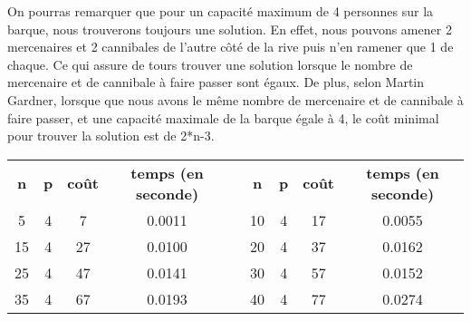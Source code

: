 \documentclass[a4paper, 12pt, french,oneside]{book}
\begin{document}
On pourras remarquer que pour un capacité maximum de 4 personnes sur la barque, nous trouverons toujours une solution. En effet, nous pouvons amener 2 mercenaires et 2 cannibales de l'autre côté de la rive puis n'en ramener que 1 de chaque. Ce qui assure de tours trouver une solution lorsque le nombre de mercenaire et de cannibale à faire passer sont égaux. De plus, selon Martin Gardner, lorsque que nous avons le même nombre de mercenaire et de cannibale à faire passer, et une capacité maximale de la barque égale à 4, le coût minimal pour trouver la solution est de 2*n-3.
\begin{table}[!ht]
    \renewcommand\arraystretch{1.2}
    \begin{tabularx}{\linewidth}{|c|c|c|c|X|c|c|c|c|}
        \cline{1-4}\cline{6-9}
        {\textbf{n}} & {\textbf{p}} & {\textbf{coût}} & {\textbf{temps (en seconde)}} &  & {\textbf{n}} & {\textbf{p}} & {\textbf{coût}} & {\textbf{temps (en seconde)}} \\
        \cline{1-4}\cline{6-9}


        5            & 4            & 7               & 0.0011                        &  &

        10           & 4            & 17              & 0.0055                                                                                                           \\

        15           & 4            & 27              & 0.0100                        &  &

        20           & 4            & 37              & 0.0162                                                                                                           \\

        25           & 4            & 47              & 0.0141                        &  &

        30           & 4            & 57              & 0.0152                                                                                                           \\

        35           & 4            & 67              & 0.0193                        &  &

        40           & 4            & 77              & 0.0274                                                                                                           \\


\end{tabularx}
\end{table}
\end{document}
